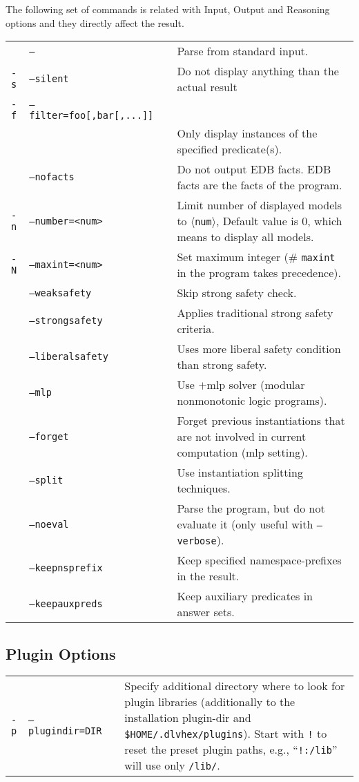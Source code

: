 \documentclass[a4paper, titlepage]{article}
\begin{document}
\bigskip
The following set of commands is related with Input, Output and  Reasoning options and they directly affect the result.
\renewcommand{\arraystretch}{1.6}
\begin{longtable}{p{2.2cm}  p{2.5cm} p{0.6cm} p{6.3cm}  } 
 & \texttt{--}& & Parse from standard input. \\ 
\texttt{-s} & \texttt{--silent}&& Do not display anything than the actual result \\ 
\texttt{-f} & \texttt{--filter=foo[,bar[,...]]} && \\
& & & Only display instances of the specified predicate(s).\\
& \texttt{--nofacts} && Do not output EDB facts. EDB facts are the facts of the program.  \\
\texttt{-n} & \texttt{--number=<num>} && Limit number of displayed models to $\langle$\texttt{num}$\rangle$, Default value is 0, which means to display all models.\\ 
\texttt{-N} & \texttt{--maxint=<num>} && Set maximum integer (\# \texttt{maxint} in the program takes precedence). \\
 & \texttt{--weaksafety} && Skip strong safety check.\\
 & \texttt{--strongsafety} && Applies traditional strong safety criteria. \\
  & \texttt{--liberalsafety} && Uses more liberal safety condition than strong safety. \\
  &\texttt{--mlp}&& Use \dlvhex{}$+$mlp solver (modular nonmonotonic logic programs).\\
  & \texttt{--forget} && Forget previous instantiations that are not involved in current computation (mlp setting). \\
  & \texttt{--split} &&Use instantiation splitting techniques.\\
  & \texttt{--noeval} && Parse the program, but do not evaluate it (only useful with \texttt{--verbose}). \\
  & \texttt{--keepnsprefix} && Keep specified namespace-prefixes in the result. \\
  & \texttt{--keepauxpreds} && Keep auxiliary predicates in answer sets. \\
\end{longtable}
\bigskip
\subsection{Plugin Options}
\begin{center}
\begin{tabular}{p{2.2cm}  p{2.5cm} p{0.6cm} p{6.3cm}  } 
 \texttt{-p}&\texttt{--plugindir=DIR}&&Specify additional directory where to look for plugin libraries (additionally to the installation plugin-dir and \texttt{\$HOME/.dlvhex/plugins}). Start with \texttt{!} to reset the preset plugin paths, e.g., ``\texttt{!:/lib}'' will use only \texttt{/lib/}.
 \\
\end{tabular}
\end{center}
\end{document}
